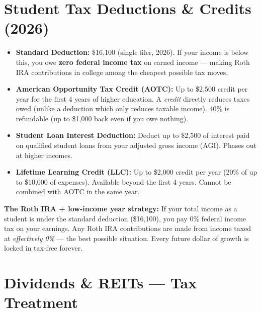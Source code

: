 \documentclass[11pt, letterpaper]{article}
\begin{document}
\section*{Student Tax Deductions \& Credits (2026)}

\begin{tcolorbox}[colback=part5bg, colframe=sectionteal,
  title={\bfseries Key Tax Benefits for College Students}, arc=3pt, boxrule=1pt]
\begin{itemize}[noitemsep, leftmargin=*]
  \item \textbf{Standard Deduction:} \$16{,}100 (single filer, 2026). If your income is below this, you owe \textbf{zero federal income tax} on earned income --- making Roth IRA contributions in college among the cheapest possible tax moves.
  \item \textbf{American Opportunity Tax Credit (AOTC):} Up to \$2{,}500 credit per year for the first 4 years of higher education. A \emph{credit} directly reduces taxes owed (unlike a deduction which only reduces taxable income). 40\% is refundable (up to \$1{,}000 back even if you owe nothing).
  \item \textbf{Student Loan Interest Deduction:} Deduct up to \$2{,}500 of interest paid on qualified student loans from your adjusted gross income (AGI). Phases out at higher incomes.
  \item \textbf{Lifetime Learning Credit (LLC):} Up to \$2{,}000 credit per year (20\% of up to \$10{,}000 of expenses). Available beyond the first 4 years. Cannot be combined with AOTC in the same year.
\end{itemize}
\end{tcolorbox}

\begin{tcolorbox}[colback=notebg, colframe=noteborder, arc=3pt, boxrule=1pt]
\textbf{The Roth IRA + low-income year strategy:} If your total income as a student is under the standard deduction (\$16{,}100), you pay 0\% federal income tax on your earnings. Any Roth IRA contributions are made from income taxed at \emph{effectively 0\%} --- the best possible situation. Every future dollar of growth is locked in tax-free forever.
\end{tcolorbox}

\section*{Dividends \& REITs --- Tax Treatment}
\end{document}
